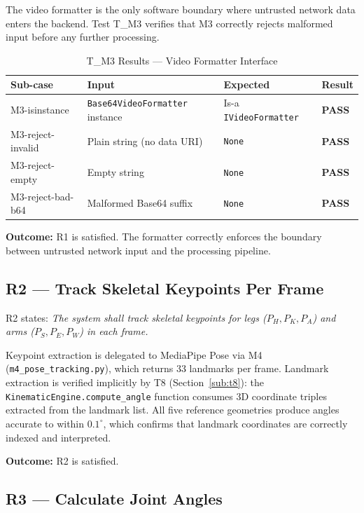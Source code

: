 \documentclass[12pt, titlepage]{article}
\newcommand{\ppass}{\textcolor{green!60!black}{\textbf{PASS}}}
\begin{document}
The video formatter is the only software boundary where untrusted network data
enters the backend. Test T\_M3 verifies that M3 correctly rejects malformed
input before any further processing.

\begin{table}[H]
\centering
\begin{tabular}{p{3.2cm} p{4.5cm} p{3cm} p{1.2cm}}
\toprule
\textbf{Sub-case} & \textbf{Input} & \textbf{Expected} & \textbf{Result}\\
\midrule
M3-isinstance     & \texttt{Base64VideoFormatter} instance & Is-a \texttt{IVideoFormatter} & \ppass \\
M3-reject-invalid & Plain string (no data URI)             & \texttt{None}                 & \ppass \\
M3-reject-empty   & Empty string                           & \texttt{None}                 & \ppass \\
M3-reject-bad-b64 & Malformed Base64 suffix                & \texttt{None}                 & \ppass \\
\bottomrule
\end{tabular}
\caption{T\_M3 Results --- Video Formatter Interface}
\label{tab:m3}
\end{table}

\textbf{Outcome:} R1 is satisfied. The formatter correctly enforces the boundary
between untrusted network input and the processing pipeline.

\subsection{R2 --- Track Skeletal Keypoints Per Frame}

R2 states: \textit{The system shall track skeletal keypoints for legs
($P_H, P_K, P_A$) and arms ($P_S, P_E, P_W$) in each frame.}

Keypoint extraction is delegated to MediaPipe Pose via M4
(\texttt{m4\_pose\_tracking.py}), which returns 33 landmarks per frame.
Landmark extraction is verified implicitly by T8 (Section~\ref{sub:t8}):
the \texttt{KinematicEngine.compute\_angle} function consumes 3D coordinate
triples extracted from the landmark list. All five reference geometries
produce angles accurate to within $0.1^\circ$, which confirms that landmark
coordinates are correctly indexed and interpreted.

\textbf{Outcome:} R2 is satisfied.

\subsection{R3 --- Calculate Joint Angles}
\end{document}
